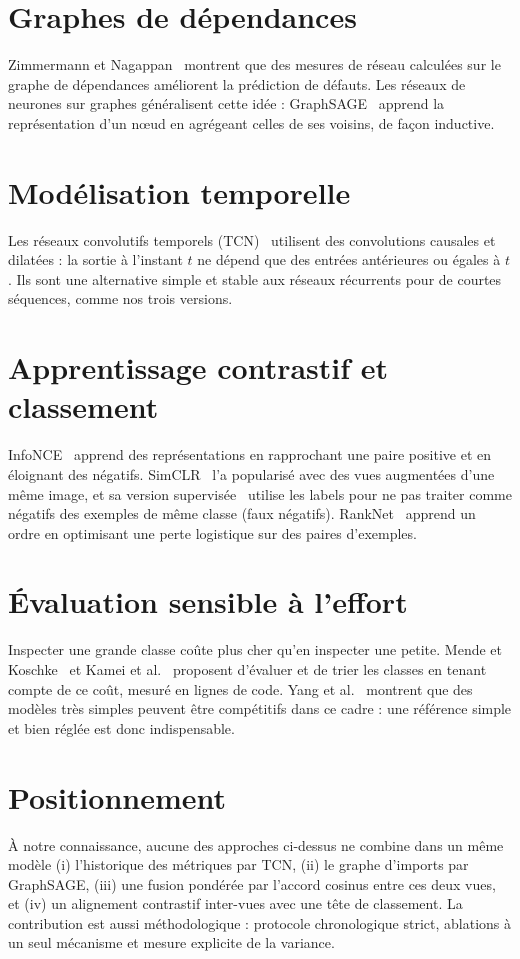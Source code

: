 \documentclass[11pt,a4paper,openany]{report}
\begin{document}
\section{Graphes de dépendances}
Zimmermann et Nagappan~\cite{zimmermann2008} montrent que des mesures de réseau calculées sur le graphe de
dépendances améliorent la prédiction de défauts. Les réseaux de neurones sur graphes généralisent cette idée :
GraphSAGE~\cite{hamilton2017} apprend la représentation d'un nœud en agrégeant celles de ses voisins, de façon
inductive.

\section{Modélisation temporelle}
Les réseaux convolutifs temporels (TCN)~\cite{bai2018} utilisent des convolutions causales et dilatées : la sortie à
l'instant $t$ ne dépend que des entrées antérieures ou égales à $t$. Ils sont une alternative simple et stable aux
réseaux récurrents pour de courtes séquences, comme nos trois versions.

\section{Apprentissage contrastif et classement}
InfoNCE~\cite{oord2018} apprend des représentations en rapprochant une paire positive et en éloignant des négatifs.
SimCLR~\cite{chen2020} l'a popularisé avec des vues augmentées d'une même image, et sa version
supervisée~\cite{khosla2020} utilise les labels pour ne pas traiter comme négatifs des exemples de même classe (faux
négatifs). RankNet~\cite{burges2005} apprend un ordre en optimisant une perte logistique sur des paires d'exemples.

\section{Évaluation sensible à l'effort}
Inspecter une grande classe coûte plus cher qu'en inspecter une petite. Mende et Koschke~\cite{mende2010} et Kamei
et al.~\cite{kamei2013} proposent d'évaluer et de trier les classes en tenant compte de ce coût, mesuré en lignes de
code. Yang et al.~\cite{yang2016} montrent que des modèles très simples peuvent être compétitifs dans ce cadre :
une référence simple et bien réglée est donc indispensable.

\section{Positionnement}
\begin{keybox}
À notre connaissance, aucune des approches ci-dessus ne combine dans un même modèle (i) l'historique des métriques
par TCN, (ii) le graphe d'imports par GraphSAGE, (iii) une fusion pondérée par l'accord cosinus entre ces deux vues,
et (iv) un alignement contrastif inter-vues avec une tête de classement. La contribution est aussi méthodologique :
protocole chronologique strict, ablations à un seul mécanisme et mesure explicite de la variance.
\end{keybox}
\end{document}
